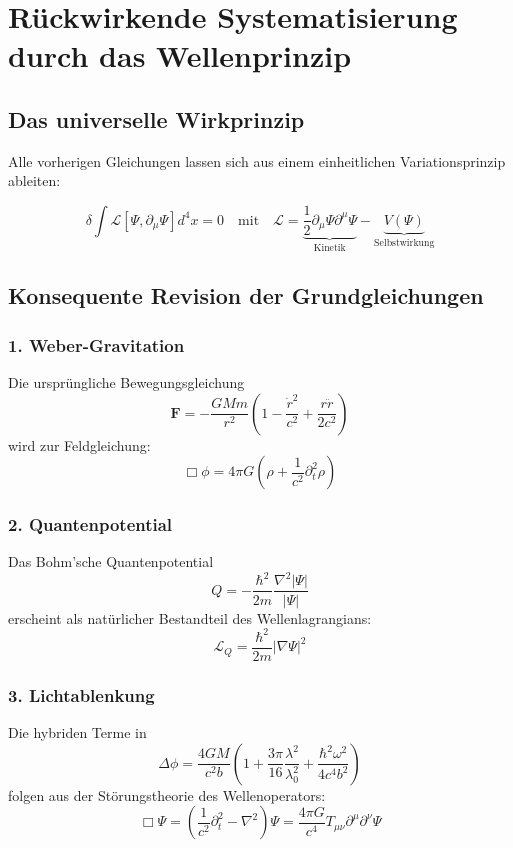\section{Rückwirkende Systematisierung durch das Wellenprinzip}
\label{sec:wellenprinzip_systematik}

\subsection{Das universelle Wirkprinzip}
Alle vorherigen Gleichungen lassen sich aus einem einheitlichen Variationsprinzip ableiten:

\begin{equation}
\delta \int \mathcal{L}[\Psi,\partial_\mu\Psi] d^4x = 0 \quad \text{mit} \quad 
\mathcal{L} = \underbrace{\frac{1}{2}\partial_\mu\Psi\partial^\mu\Psi}_{\text{Kinetik}} - \underbrace{V(\Psi)}_{\text{Selbstwirkung}}
\end{equation}

\subsection{Konsequente Revision der Grundgleichungen}

\subsubsection{1. Weber-Gravitation}
Die ursprüngliche Bewegungsgleichung
\begin{equation}
\mathbf{F} = -\frac{GMm}{r^2}\left(1-\frac{\dot{r}^2}{c^2}+\frac{r\ddot{r}}{2c^2}\right)
\end{equation}
wird zur Feldgleichung:
\begin{equation}
\Box \phi = 4\pi G\left(\rho + \frac{1}{c^2}\partial_t^2\rho\right)
\end{equation}

\subsubsection{2. Quantenpotential}
Das Bohm'sche Quantenpotential
\begin{equation}
Q = -\frac{\hbar^2}{2m}\frac{\nabla^2|\Psi|}{|\Psi|}
\end{equation}
erscheint als natürlicher Bestandteil des Wellenlagrangians:
\begin{equation}
\mathcal{L}_Q = \frac{\hbar^2}{2m}|\nabla\Psi|^2
\end{equation}

\subsubsection{3. Lichtablenkung}
Die hybriden Terme in
\begin{equation}
\Delta\phi = \frac{4GM}{c^2b}\left(1 + \frac{3\pi}{16}\frac{\lambda^2}{\lambda_0^2} + \frac{\hbar^2\omega^2}{4c^4b^2}\right)
\end{equation}
folgen aus der Störungstheorie des Wellenoperators:
\begin{equation}
\Box \Psi = \left(\frac{1}{c^2}\partial_t^2 - \nabla^2\right)\Psi = \frac{4\pi G}{c^4}T_{\mu\nu}\partial^\mu\partial^\nu\Psi
\end{equation}

